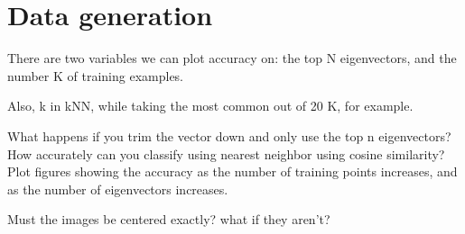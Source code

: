 \documentclass[11pt]{report}
\begin{document}
\section{Data generation}

There are two variables we can plot accuracy on: the top N eigenvectors, and the number K of training examples.

Also, k in kNN, while taking the most common out of 20 K, for example.

What happens if you trim the vector down and only use the top n eigenvectors? How accurately can you classify using nearest neighbor using cosine similarity? Plot figures showing the accuracy as the number of training points increases, and as the number of eigenvectors increases.

Must the images be centered exactly? what if they aren't?
\end{document}
